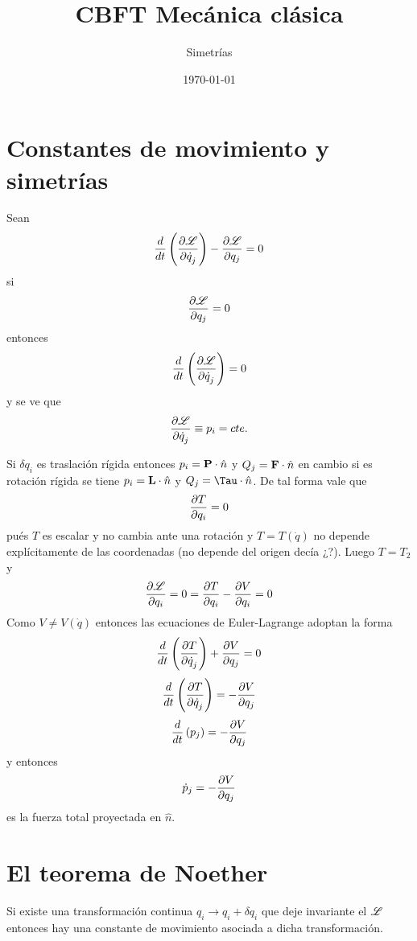 \documentclass[10pt,oneside]{CBFT_article}
\title{CBFT Mecánica clásica}
\author{Simetrías}
\date{\today}
\begin{document}
\maketitle
\tableofcontents


\section{Constantes de movimiento y simetrías}

Sean 
\[
	\frac{d}{dt}\left( \dpar{\Lag}{\dot{q}_j} \right) - \dpar{\Lag}{q_j}  = 0 
\]
si
\[
	\dpar{\Lag}{q_j}  = 0 
\]
entonces 
\[
	\frac{d}{dt}\left( \dpar{\Lag}{\dot{q}_j} \right) = 0
\]
y se ve que 
\[
	\dpar{\Lag}{\dot{q}_j} \equiv p_i = cte.
\]

Si $\delta q_i$ es traslación rígida entonces $p_i = \vb{P}\cdot\hat{n}$ y $Q_j= \vb{F}\cdot\hat{n}$ en
cambio si es rotación rígida se tiene $p_i = \vb{L}\cdot\hat{n}$ y $Q_j= \vb{\Tau}\cdot\hat{n}$.
De tal forma vale que 
\[
	\dpar{T}{q_i} = 0
\]
pués $T$ es escalar y no cambia ante una rotación y $T=T(\dot{q})$ no depende explícitamente de las
coordenadas (no depende del origen decía ¿?). Luego $T=T_2$ y
\[
	\dpar{\Lag}{q_i} = 0 = \dpar{T}{q_i} - \dpar{V}{q_i} = 0
\]
Como $V \neq V(\dot{q})$ entonces las ecuaciones de Euler-Lagrange adoptan la forma
\[
	\frac{d}{dt}\left( \dpar{T}{\dot{q}_j} \right) + \dpar{V}{q_j}  = 0 
\]
\[
	\frac{d}{dt}\left( \dpar{T}{\dot{q}_j} \right) = - \dpar{V}{q_j}   
\]
\[
	\frac{d}{dt}\left( p_j \right) = - \dpar{V}{q_j}   
\]
y entonces 
\[
	\dot{p}_j = -\dpar{V}{q_j}   
\]
es la fuerza total proyectada en $\hat{n}$.

\section{El teorema de Noether}

Si existe una transformación continua $q_i \longrightarrow q_i + \delta q_i$ que deje invariante el
$\Lag$ entonces hay una constante de movimiento asociada a dicha transformación.
\end{document}
